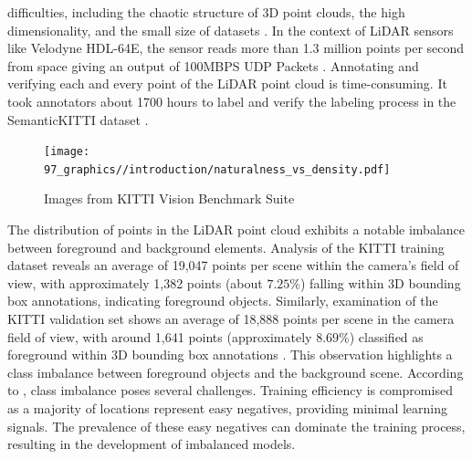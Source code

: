 difficulties, including the chaotic structure of 3D point clouds, the high dimensionality, and the small size of datasets \parencite{qi2017pointnet}. In the context of LiDAR sensors like Velodyne HDL-64E, the sensor reads more than 1.3 million points per second from space giving an output of 100MBPS UDP Packets \parencite{velodyne_64}. Annotating and verifying each and every point of the LiDAR point cloud is time-consuming. It took annotators about 1700 hours to label and verify the labeling process in the SemanticKITTI dataset \parencite{behley2019semantickitti}.

\begin{figure}[htbp]
    \centering
    \texttt{[image: 97\_graphics//introduction/naturalness\_vs\_density.pdf]}
    \caption{Images from KITTI Vision Benchmark Suite\parencite{Geiger2012CVPR}}
    \label{fig:introduction_surf_variation_in_kitti}
\end{figure}
The distribution of points in the LiDAR point cloud exhibits a notable imbalance between foreground and background elements. Analysis of the KITTI training dataset reveals an average of 19,047 points per scene within the camera's field of view, with approximately 1,382 points (about \(7.25\%\)) falling within 3D bounding box annotations, indicating foreground objects. Similarly, examination of the KITTI validation set shows an average of 18,888 points per scene in the camera field of view, with around 1,641 points (approximately \(8.69\%\)) classified as foreground within 3D bounding box annotations \parencite{DBLP:journals/corr/abs-2004-01643}. This observation highlights a class imbalance between foreground objects and the background scene. According to \parencite{DBLP:journals/corr/abs-1708-02002}, class imbalance poses several challenges. Training efficiency is compromised as a majority of locations represent easy negatives, providing minimal learning signals. The prevalence of these easy negatives can dominate the training process, resulting in the development of imbalanced models.
